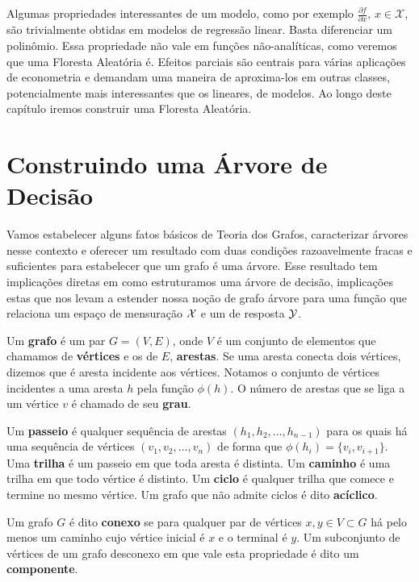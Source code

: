 Algumas propriedades interessantes de um modelo, como por exemplo $\frac{\partial f}{\partial x}, \, x \in \mathcal{X}$, são trivialmente obtidas em modelos de regressão linear. Basta diferenciar um polinômio. Essa propriedade não vale em funções não-analíticas, como veremos que uma Floresta Aleatória é. Efeitos parciais são centrais para várias aplicações de econometria e demandam uma maneira de aproxima-los em outras classes, potencialmente mais interessantes que os lineares, de modelos. Ao longo deste capítulo iremos construir uma Floresta Aleatória.

\section{Construindo uma Árvore de Decisão}

Vamos estabelecer alguns fatos básicos de Teoria dos Grafos, caracterizar árvores nesse contexto e oferecer um resultado com duas condições razoavelmente fracas e suficientes para estabelecer que um grafo é uma árvore. Esse resultado tem implicações diretas em como estruturamos uma árvore de decisão, implicações estas que nos levam a estender nossa noção de grafo árvore para uma função que relaciona um espaço de mensuração $\mathcal{X}$ e um de resposta $\mathcal{Y}$.

\begin{defi}
Um \textbf{grafo} é um par $G = (V, E)$, onde $V$ é um conjunto de elementos que chamamos de \textbf{vértices} e os de $E$, \textbf{arestas}. Se uma aresta conecta dois vértices, dizemos que é aresta incidente aos vértices. Notamos o conjunto de vértices incidentes a uma aresta $h$ pela função $\phi(h)$. O número de arestas que se liga a um vértice $v$ é chamado de seu \textbf{grau}.
\end{defi}

\begin{defi}
Um \textbf{passeio} é qualquer sequência de arestas $(h_1, h_2, ..., h_{n-1})$ para os quais há uma sequência de vértices $(v_1, v_2, ..., v_n)$ de forma que $\phi(h_i) = \{v_i, v_{i+1}\}$. Uma \textbf{trilha} é um passeio em que toda aresta é distinta. Um \textbf{caminho} é uma trilha em que todo vértice é distinto. Um \textbf{ciclo} é qualquer trilha que comece e termine no mesmo vértice. Um grafo que não admite ciclos é dito \textbf{acíclico}.
\end{defi}

\begin{defi}
Um grafo $G$ é dito \textbf{conexo} se para qualquer par de vértices $x, y \in V \subset G$ há pelo menos um caminho cujo vértice inicial é $x$ e o terminal é $y$. Um subconjunto de vértices de um grafo desconexo em que vale esta propriedade é dito um \textbf{componente}.
\end{defi}


